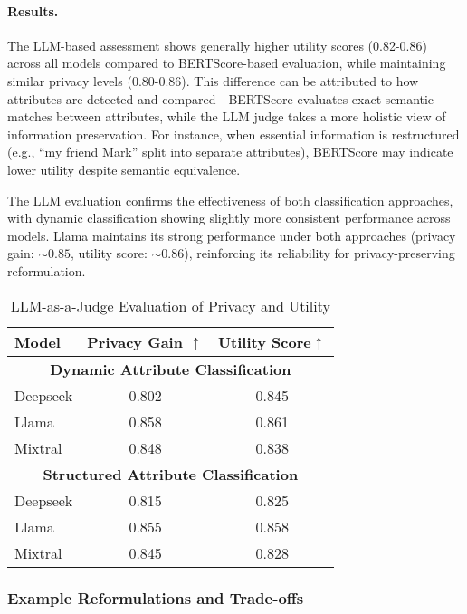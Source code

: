 \paragraph{Results.} The LLM-based assessment shows generally higher utility scores (0.82-0.86) across all models compared to BERTScore-based evaluation, while maintaining similar privacy levels (0.80-0.86). This difference can be attributed to how attributes are detected and compared—BERTScore evaluates exact semantic matches between attributes, while the LLM judge takes a more holistic view of information preservation. For instance, when essential information is restructured (e.g., ``my friend Mark'' split into separate attributes), BERTScore may indicate lower utility despite semantic equivalence.

The LLM evaluation confirms the effectiveness of both classification approaches, with dynamic classification showing slightly more consistent performance across models. Llama maintains its strong performance under both approaches (privacy gain: $\sim0.85$, utility score: $\sim0.86$), reinforcing its reliability for privacy-preserving reformulation.


\begin{table}[t]
\small
\centering
\caption{LLM-as-a-Judge Evaluation of Privacy and Utility}
\begin{tabular}{lcc}
\toprule
\textbf{Model} & \textbf{Privacy Gain $\uparrow$} & \textbf{Utility Score$\uparrow$} \\ 
\midrule
\multicolumn{3}{c}{\textbf{Dynamic Attribute Classification}} \\ 
\midrule
Deepseek  & 0.802 & 0.845 \\ 
Llama     & 0.858 & 0.861 \\ 
Mixtral   & 0.848 & 0.838 \\ 
\midrule
\multicolumn{3}{c}{\textbf{Structured Attribute Classification}} \\ 
\midrule
Deepseek  & 0.815 & 0.825 \\ 
Llama     & 0.855 & 0.858 \\ 
Mixtral   & 0.845 & 0.828 \\ 
\bottomrule
\end{tabular}
\label{tab:llm_judge_results}
\end{table}

\subsubsection{Example Reformulations and Trade-offs}
